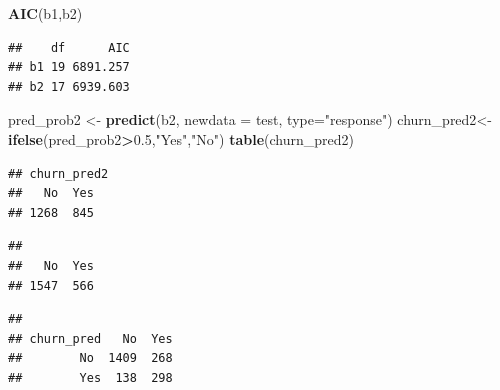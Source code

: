 \documentclass[
  twoside]{article}
\newenvironment{Shaded}{\begin{snugshade}}{\end{snugshade}}
\newcommand{\AttributeTok}[1]{\textcolor[rgb]{0.13,0.29,0.53}{#1}}
\newcommand{\CommentTok}[1]{\textcolor[rgb]{0.56,0.35,0.01}{\textit{#1}}}
\newcommand{\FloatTok}[1]{\textcolor[rgb]{0.00,0.00,0.81}{#1}}
\newcommand{\FunctionTok}[1]{\textcolor[rgb]{0.13,0.29,0.53}{\textbf{#1}}}
\newcommand{\NormalTok}[1]{#1}
\newcommand{\OtherTok}[1]{\textcolor[rgb]{0.56,0.35,0.01}{#1}}
\newcommand{\SpecialCharTok}[1]{\textcolor[rgb]{0.81,0.36,0.00}{\textbf{#1}}}
\newcommand{\StringTok}[1]{\textcolor[rgb]{0.31,0.60,0.02}{#1}}
\begin{document}
\begin{Shaded}
\begin{Highlighting}[]
\FunctionTok{AIC}\NormalTok{(b1,b2)}
\end{Highlighting}
\end{Shaded}

\begin{verbatim}
##    df      AIC
## b1 19 6891.257
## b2 17 6939.603
\end{verbatim}

\begin{Shaded}
\begin{Highlighting}[]
\NormalTok{pred\_prob2 }\OtherTok{\textless{}{-}} \FunctionTok{predict}\NormalTok{(b2, }\AttributeTok{newdata =}\NormalTok{ test, }\AttributeTok{type=}\StringTok{"response"}\NormalTok{)}
\NormalTok{churn\_pred2}\OtherTok{\textless{}{-}} \FunctionTok{ifelse}\NormalTok{(pred\_prob2}\SpecialCharTok{\textgreater{}}\FloatTok{0.5}\NormalTok{,}\StringTok{"Yes"}\NormalTok{,}\StringTok{"No"}\NormalTok{)}
\FunctionTok{table}\NormalTok{(churn\_pred2)}
\end{Highlighting}
\end{Shaded}

\begin{verbatim}
## churn_pred2
##   No  Yes 
## 1268  845
\end{verbatim}

\begin{Shaded}
\end{Shaded}

\begin{verbatim}
## 
##   No  Yes 
## 1547  566
\end{verbatim}

\begin{Shaded}
\end{Shaded}

\begin{verbatim}
##           
## churn_pred   No  Yes
##        No  1409  268
##        Yes  138  298
\end{verbatim}
\end{document}
